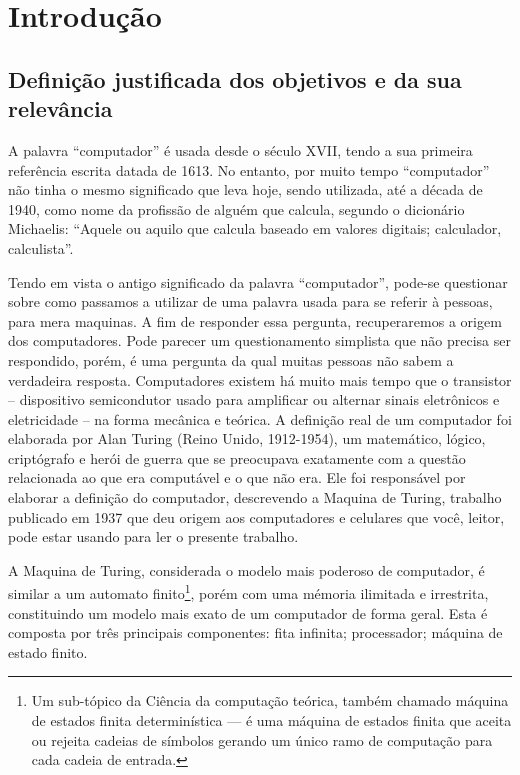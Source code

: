 \section{Introdução} 
\subsection{Definição justificada dos objetivos e da sua relevância}
A palavra “computador” é usada desde o século XVII, tendo a sua primeira referência escrita datada de 1613. No entanto, por muito tempo “computador” não tinha o mesmo significado que leva hoje, sendo utilizada, até a década de 1940, como nome da profissão de alguém que calcula, segundo o dicionário Michaelis: “Aquele ou aquilo que calcula baseado em valores digitais; calculador, calculista”. \cite{4}

Tendo em vista o antigo significado da palavra “computador”, pode-se questionar sobre como passamos a utilizar de uma palavra usada para se referir à pessoas, para mera maquinas. A fim de responder essa pergunta, recuperaremos a origem dos computadores. Pode parecer um questionamento simplista que não precisa ser respondido, porém, é uma pergunta da qual muitas pessoas não sabem a verdadeira resposta. Computadores existem há muito mais tempo que o transistor – dispositivo semicondutor usado para amplificar ou alternar sinais eletrônicos e eletricidade – na forma mecânica e teórica. A definição real de um computador foi elaborada por Alan Turing (Reino Unido, 1912-1954), um matemático, lógico, criptógrafo e herói de guerra que se preocupava exatamente com a questão relacionada ao que era computável e o que não era. Ele foi responsável por elaborar a definição do computador, descrevendo a Maquina de Turing, trabalho publicado em 1937 que deu origem aos computadores e celulares que você, leitor, pode estar usando para ler o presente trabalho.

A Maquina de Turing, considerada o modelo mais poderoso de computador, é similar a um automato finito\footnote{Um sub-tópico da Ciência da computação teórica, também chamado máquina de estados finita determinística — é uma máquina de estados finita que aceita ou rejeita cadeias de símbolos gerando um único ramo de computação para cada cadeia de entrada.}, porém com uma mémoria ilimitada e irrestrita, constituindo um modelo mais exato de um computador de forma geral. Esta é composta por três principais componentes: fita infinita; processador; máquina de estado finito. 

